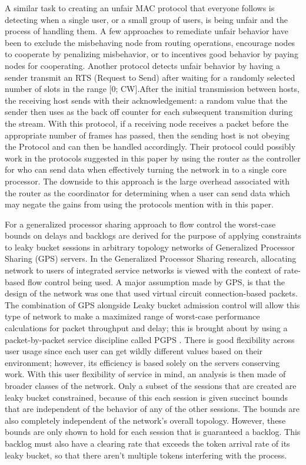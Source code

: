 \documentclass{sigcomm-alternate}
\begin{document}
A similar task to creating an unfair MAC protocol that everyone follows is detecting when a single user, or a small group of users, is being unfair and the process of handling them. A few approaches to remediate unfair behavior have been to exclude the misbehaving node from routing operations, encourage nodes to cooperate by penalizing misbehavior, or to incentives good behavior by paying nodes for cooperating. Another protocol detects unfair behavior by having a sender transmit an RTS (Request to Send) after waiting for a randomly selected number of slots in the range [0; CW].After the initial transmission between hosts, the receiving host sends with their acknowledgement: a random value that the sender then uses as the back off counter for each subsequent transmition during the stream. \cite{Kyasanur} With this protocol, if a receiving node receives a packet before the appropriate number of frames has passed, then the sending host is not obeying the Protocol and can then be handled accordingly. Their protocol could possibly work in the protocols suggested in this paper by using the router as the controller for who can send data when effectively turning the network in to a single core processor. The downside to this approach is the large overhead associated with the router as the coordinator for determining when a user can send data which may negate the gains from using the protocols mention with in this paper.

For a generalized processor sharing approach to flow control the worst-case bounds on delays and backlogs are derived for the purpose of applying constraints to leaky bucket sessions in arbitrary topology networks of Generalized Processor Sharing (GPS) \cite{Parek} servers. In the Generalized Processor Sharing research, allocating network to users of integrated service networks is viewed with the context of rate-based flow control being used. A major assumption made by GPS, is that the design of the network was one that used virtual circuit connection-based packets. The combination of GPS alongside Leaky bucket admission control will allow this type of network to make a maximized range of worst-case performance calculations for packet throughput and delay; this is brought about by using a packet-by-packet service discipline called PGPS \cite{demers}. There is good flexibility across user usage since each user can get wildly different values based on their environment; however, its efficiency is based solely on the servers conserving work. 
With this user flexibility of service in mind, an analysis is then made of broader classes of the network. Only a subset of the sessions that are created are leaky bucket constrained, because of this each session is given succinct bounds that are independent of the behavior of any of the other sessions. The bounds are also completely independent of the network's overall topology. However, these bounds are only shown to hold for each session that is guaranteed a backlog. This backlog must also have a clearing rate that exceeds the token arrival rate of its leaky bucket, so that there aren't multiple tokens interfering with the process.
\end{document}
